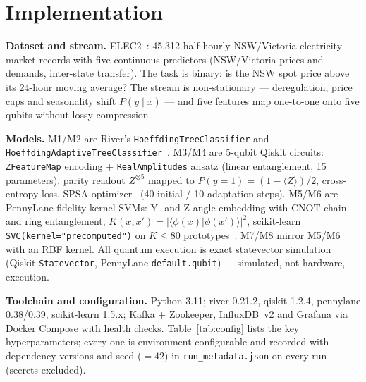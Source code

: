 \documentclass[conference]{IEEEtran}
\begin{document}
\section{Implementation}
\label{sec:impl}

\textbf{Dataset and stream.} ELEC2~\cite{harries1999}: 45{,}312 half-hourly NSW/Victoria
electricity market records with five continuous predictors (NSW/Victoria prices and
demands, inter-state transfer). The task is binary: is the NSW spot price above its
24-hour moving average? The stream is non-stationary --- deregulation, price caps and
seasonality shift $P(y \mid x)$ --- and five features map one-to-one onto five qubits
without lossy compression.

\textbf{Models.} M1/M2 are River's \texttt{HoeffdingTreeClassifier} and
\texttt{HoeffdingAdaptiveTreeClassifier}~\cite{river}. M3/M4 are 5-qubit Qiskit circuits:
\texttt{ZFeatureMap} encoding + \texttt{RealAmplitudes} ansatz (linear entanglement,
15 parameters), parity readout $Z^{\otimes 5}$ mapped to $P(y=1) = (1-\langle Z\rangle)/2$,
cross-entropy loss, SPSA optimizer~\cite{spall1992} (40 initial / 10 adaptation steps).
M5/M6 are PennyLane fidelity-kernel SVMs: Y- and Z-angle embedding with CNOT chain and
ring entanglement, $K(x,x') = |\langle\phi(x)|\phi(x')\rangle|^2$, scikit-learn
\texttt{SVC(kernel="precomputed")} on $K \le 80$ prototypes~\cite{pennylane,sklearn}.
M7/M8 mirror M5/M6 with an RBF kernel. All quantum execution is exact statevector
simulation (Qiskit \texttt{Statevector}, PennyLane \texttt{default.qubit}) --- simulated,
not hardware, execution.

\textbf{Toolchain and configuration.} Python 3.11; river 0.21.2, qiskit 1.2.4,
pennylane 0.38/0.39, scikit-learn 1.5.x; Kafka + Zookeeper, InfluxDB~v2 and Grafana via
Docker Compose with health checks. Table~\ref{tab:config} lists the key hyperparameters;
every one is environment-configurable and recorded with dependency versions and seed
($=42$) in \texttt{run\_metadata.json} on every run (secrets excluded).
\end{document}
